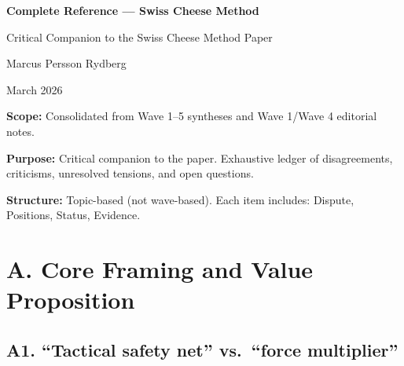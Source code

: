 \documentclass[11pt,letterpaper]{article}
\begin{document}
\begin{titlepage}
\centering
\vspace*{3cm}
{\LARGE\bfseries Complete Reference --- Swiss Cheese Method\par}
\vspace{1cm}
{\Large Critical Companion to the Swiss Cheese Method Paper\par}
\vspace{2cm}
{\large Marcus Persson Rydberg\par}
\vspace{1cm}
{\large March 2026\par}
\vfill
\end{titlepage}

\thispagestyle{empty}

\textbf{Scope:} Consolidated from Wave 1--5 syntheses and Wave 1/Wave 4 editorial notes.

\textbf{Purpose:} Critical companion to the paper. Exhaustive ledger of disagreements, criticisms, unresolved tensions, and open questions.

\textbf{Structure:} Topic-based (not wave-based). Each item includes: Dispute, Positions, Status, Evidence.

\tableofcontents
\newpage

\section{A. Core Framing and Value Proposition}

\subsection{A1. ``Tactical safety net'' vs.\ ``force multiplier''}
\end{document}
